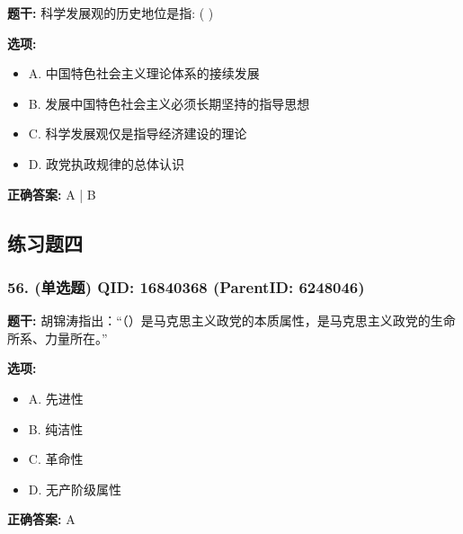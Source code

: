 \documentclass[12pt,UTF8]{ctexart}
\begin{document}
\textbf{题干:}
科学发展观的历史地位是指: ( )



\textbf{选项:}
\begin{itemize}[leftmargin=*]

  \item A. 中国特色社会主义理论体系的接续发展

  \item B. 发展中国特色社会主义必须长期坚持的指导思想

  \item C. 科学发展观仅是指导经济建设的理论

  \item D. 政党执政规律的总体认识

\end{itemize}

\textbf{正确答案:}
A | B

\vspace{0.3em}\hrulefill\vspace{0.7em}

\subsection*{练习题四}

\subsubsection*{56. (单选题) \small QID: 16840368 (ParentID: 6248046)}

\textbf{题干:}
胡锦涛指出：“（）是马克思主义政党的本质属性，是马克思主义政党的生命所系、力量所在。”



\textbf{选项:}
\begin{itemize}[leftmargin=*]

  \item A. 先进性

  \item B. 纯洁性

  \item C. 革命性

  \item D. 无产阶级属性

\end{itemize}

\textbf{正确答案:}
A

\vspace{0.3em}\hrulefill\vspace{0.7em}
\end{document}
